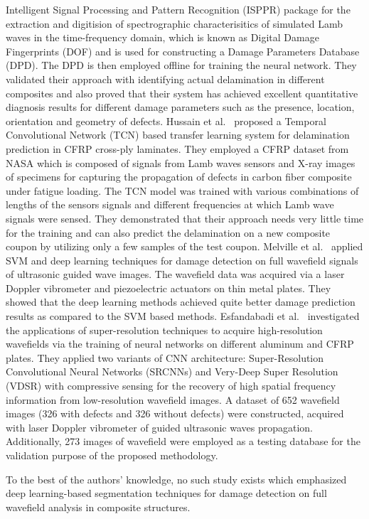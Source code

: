 Intelligent Signal Processing and Pattern Recognition (ISPPR) package for the extraction and digitision of spectrographic characterisitics of simulated Lamb waves in the time-frequency domain, which is known as Digital Damage Fingerprints (DOF) and is used for constructing a Damage Parameters Database (DPD). The DPD is then employed offline for training the neural network. They validated their approach with identifying actual delamination in different composites and also proved that their system has achieved excellent quantitative diagnosis results for different damage parameters such as the presence, location, orientation and geometry of defects. Hussain et al.~\cite{hussaintemporal} proposed a Temporal Convolutional Network (TCN) based transfer learning system for delamination prediction in CFRP cross-ply laminates. They employed a CFRP dataset from NASA which is composed of signals from Lamb waves sensors and X-ray images of specimens for capturing the propagation of defects in carbon fiber composite under fatigue loading. The TCN model was trained with various combinations of lengths of the sensors signals and different frequencies at which Lamb wave signals were sensed. They demonstrated that their approach needs very little time for the training and can also predict the delamination on a new composite coupon by utilizing only a few samples of the test coupon. Melville et al.~\cite{melville2018structural} applied SVM and deep learning techniques for damage detection on full wavefield signals of ultrasonic guided wave images. The wavefield data was acquired via a laser Doppler vibrometer and piezoelectric actuators on thin metal plates. They showed that the deep learning methods achieved quite better damage prediction results as compared to the SVM based methods. Esfandabadi et al.~\cite{keshmiri2019deep} investigated the applications of super-resolution techniques to acquire high-resolution wavefields via the training of neural networks on different aluminum and CFRP plates. They applied two variants of CNN architecture: Super-Resolution Convolutional Neural Networks (SRCNNs) and Very-Deep Super Resolution (VDSR) with compressive sensing for the recovery of high spatial frequency information from low-resolution wavefield images. A dataset of 652 wavefield images (326 with defects and 326 without defects) were constructed, acquired with laser Doppler vibrometer of guided ultrasonic waves propagation. Additionally, 273 images of wavefield were employed as a testing database for the validation purpose of the proposed methodology.           

To the best of the authors' knowledge, no such study exists which emphasized deep learning-based segmentation techniques for damage detection on full wavefield analysis in composite structures.